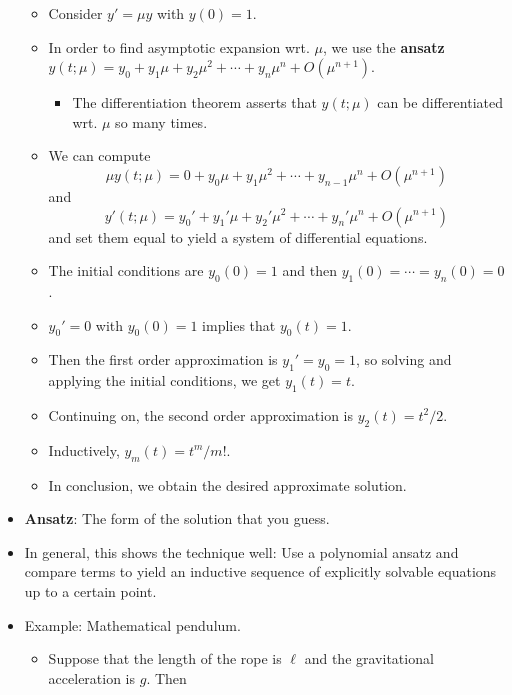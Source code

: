 \documentclass[../notes.tex]{subfiles}
\begin{document}
\begin{itemize}
    \begin{itemize}
        \item Consider $y'=\mu y$ with $y(0)=1$.
        \item In order to find asymptotic expansion wrt. $\mu$, we use the \textbf{ansatz} $y(t;\mu)=y_0+y_1\mu+y_2\mu^2+\cdots+y_n\mu^n+O(\mu^{n+1})$.
        \begin{itemize}
            \item The differentiation theorem asserts that $y(t;\mu)$ can be differentiated wrt. $\mu$ so many times.
        \end{itemize}
        \item We can compute
        \begin{equation*}
            \mu y(t;\mu) = 0+y_0\mu+y_1\mu^2+\cdots+y_{n-1}\mu^n+O(\mu^{n+1})
        \end{equation*}
        and
        \begin{equation*}
            y'(t;\mu) = y_0'+y_1'\mu+y_2'\mu^2+\cdots+y_n'\mu^n+O(\mu^{n+1})
        \end{equation*}
        and set them equal to yield a system of differential equations.
        \item The initial conditions are $y_0(0)=1$ and then $y_1(0)=\cdots=y_n(0)=0$.
        \item $y_0'=0$ with $y_0(0)=1$ implies that $y_0(t)=1$.
        \item Then the first order approximation is $y_1'=y_0=1$, so solving and applying the initial conditions, we get $y_1(t)=t$.
        \item Continuing on, the second order approximation is $y_2(t)=t^2/2$.
        \item Inductively, $y_m(t)=t^m/m!$.
        \item In conclusion, we obtain the desired approximate solution.
    \end{itemize}
    \item \textbf{Ansatz}: The form of the solution that you guess.
    \item In general, this shows the technique well: Use a polynomial ansatz and compare terms to yield an inductive sequence of explicitly solvable equations up to a certain point.
    \item Example: Mathematical pendulum.
    \begin{itemize}
        \item Suppose that the length of the rope is $\ell$ and the gravitational acceleration is $g$. Then
        \begin{equation*}

\end{equation*}
\end{itemize}
\end{itemize}
\end{document}
